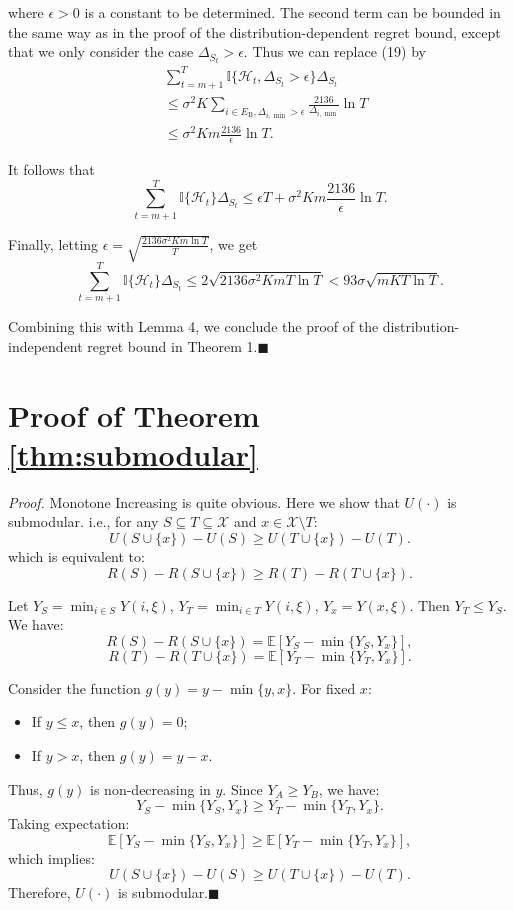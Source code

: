 \documentclass[opre,sglanonrev]{informs4}
\begin{document}
where $\epsilon>0$ is a constant to be determined. The second term can be bounded in the same way as in the proof of the distribution-dependent regret bound, except that we only consider the case $\Delta_{S_t}>\epsilon$. Thus we can replace (19) by
\begin{equation}
	\begin{aligned}
		&\sum_{t=m+1}^T\mathbb{I}\{\mathcal{H}_t,\Delta_{S_t}>\epsilon\}\Delta_{S_t}\\
		&\leq \sigma^2K\sum_{i\in E_\mathrm{B},\Delta_{i,\min}>\epsilon}\frac{2136}{\Delta_{i,\min}}\ln T\\
		&\leq \sigma^2Km\frac{2136}{\epsilon}\ln T.
	\end{aligned}
\end{equation}

It follows that
$$\sum_{t=m+1}^T\mathbb{I}\{\mathcal{H}_t\}\Delta_{S_t}\leq\epsilon T+\sigma^2Km\frac{2136}{\epsilon}\ln T.$$

Finally, letting $\epsilon=\sqrt{\frac{2136\sigma^2Km\ln T}{T}}$, we get 
$$\sum_{t=m+1}^T\mathbb{I}\{\mathcal{H}_t\}\Delta_{S_t}\leq2\sqrt{2136\sigma^2KmT\ln T}<93\sigma\sqrt{mKT\ln T}.$$

Combining this with Lemma 4, we conclude the proof of the distribution-independent regret bound in Theorem 1.\hfill $\blacksquare$

\section{Proof of Theorem \ref{thm:submodular}}
\textit{Proof.} Monotone Increasing is quite obvious. Here we show that $U(\cdot)$ is submodular. i.e., for any $S \subseteq T \subseteq \mathcal{X}$ and $x \in \mathcal{X} \setminus T$:
$$
U(S \cup \{x\}) - U(S) \geq U(T \cup \{x\}) - U(T).
$$
which is equivalent to:
$$
R(S)-R(S \cup \{x\}) \geq R(T) - R(T \cup \{x\}).
$$

Let $Y_S = \min_{i \in S} Y(i,\xi)$, $Y_T = \min_{i \in T} Y(i,\xi)$, $Y_x = Y(x,\xi)$. Then $Y_T \leq Y_S$. We have:
\[
R(S) - R(S \cup \{x\}) = \mathbb{E}\left[Y_S - \min\{Y_S, Y_x\}\right],
\]
\[
R(T) - R(T \cup \{x\}) = \mathbb{E}\left[Y_T - \min\{Y_T, Y_x\}\right].
\]

Consider the function $g(y) = y - \min\{y, x\}$. For fixed $x$:
\begin{itemize}
    \item If $y \leq x$, then $g(y) = 0$;
    \item If $y > x$, then $g(y) = y - x$.
\end{itemize}
Thus, $g(y)$ is non-decreasing in $y$. Since $Y_A \geq Y_B$, we have:
\[
Y_S - \min\{Y_S, Y_x\} \geq Y_T - \min\{Y_T, Y_x\}.
\]
Taking expectation:
\[
\mathbb{E}\left[Y_S - \min\{Y_S, Y_x\}\right] \geq \mathbb{E}\left[Y_T - \min\{Y_T, Y_x\}\right],
\]
which implies:
$$
U(S \cup \{x\}) - U(S) \geq U(T \cup \{x\}) - U(T).
$$
Therefore, $U(\cdot)$ is submodular.\hfill $\blacksquare$

\end{document}
